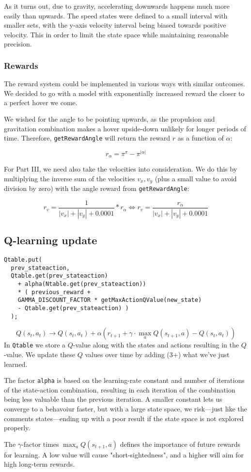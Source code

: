 As it turns out, due to gravity, accelerating downwards happens much more easily than upwards. The speed states were defined to a small interval with smaller sets, with the y-axis velocity interval being biased towards positive velocity. This in order to limit the state space while maintaining reasonable precision.

\subsubsection{Rewards}
The reward system could be implemented in various ways with similar outcomes. We decided to go with a model with exponentially increased reward the closer to a perfect hover we come.

We wished for the angle to be pointing upwards, as the propulsion and gravitation combination makes a hover upside-down unlikely for longer periods of time. Therefore, \verb=getRewardAngle= will return the reward $r$ as a function of $\alpha$:

$$ r_{\alpha} = \pi^{\pi} - \pi^{|\alpha|} $$

For Part III, we need also take the velocities into consideration. We do this by multiplying the inverse sum of the velocities $v_x,v_y$ (plus a small value to avoid division by zero) with the angle reward from \verb=getRewardAngle=:

$$ r_{v} = \frac{1}{|v_x|+|v_y|+0.0001}*r_{\alpha} \Leftrightarrow r_v = \frac{r_{\alpha}}{|v_x|+|v_y|+0.0001} $$

\subsection{Q-learning update}
\lstset{language=Java,numbers=left,breaklines=true,breakatwhitespace=true,keepspaces=true}
\begin{lstlisting}
Qtable.put(
  prev_stateaction,
  Qtable.get(prev_stateaction)
    + alpha(Ntable.get(prev_stateaction))
    * ( previous_reward +
    GAMMA_DISCOUNT_FACTOR * getMaxActionQValue(new_state)
    - Qtable.get(prev_stateaction) )
  );
\end{lstlisting}

$$ Q(s_t,a_t) \rightarrow Q(s_t,a_t)+\alpha \left(r_{t+1}+\gamma\cdot\max_a Q(s_{t+1},a) - Q(s_t,a_t)\right) $$
In \verb=Qtable= we store a $Q$-value along with the states and actions resulting in the $Q$-value. We update these $Q$ values over time by adding (3+) what we've just learned.

The factor \verb=alpha= is based on the learning-rate constant and number of iterations of the state-action combination, resulting in each iteration of the combination being less valuable than the previous iteration. A smaller constant lets us converge to a behavoiur faster, but with a large state space, we risk---just like the comments states---ending up with a poor result if the state space is not explored properly.

The $\gamma$-factor times $\max_a Q(s_{t+1},a)$ defines the importance of future rewards for learning. A low value will cause "short-sightedness", and a higher will aim for high long-term rewards.
